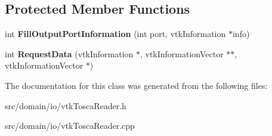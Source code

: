 \subsection*{Protected Member Functions}
\begin{DoxyCompactItemize}
\item 
\hypertarget{classvtk_tosca_reader_ab5468ebb6a747a9832089879b718e0d9}{}int {\bfseries Fill\+Output\+Port\+Information} (int port, vtk\+Information $\ast$info)\label{classvtk_tosca_reader_ab5468ebb6a747a9832089879b718e0d9}

\item 
\hypertarget{classvtk_tosca_reader_a7b6c50fd9574bd6c15ea784413288ea3}{}int {\bfseries Request\+Data} (vtk\+Information $\ast$, vtk\+Information\+Vector $\ast$$\ast$, vtk\+Information\+Vector $\ast$)\label{classvtk_tosca_reader_a7b6c50fd9574bd6c15ea784413288ea3}

\end{DoxyCompactItemize}


The documentation for this class was generated from the following files\+:\begin{DoxyCompactItemize}
\item 
src/domain/io/vtk\+Tosca\+Reader.\+h\item 
src/domain/io/vtk\+Tosca\+Reader.\+cpp\end{DoxyCompactItemize}
